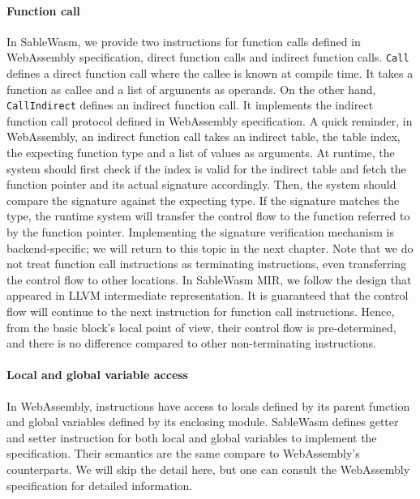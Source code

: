 \paragraph{Function call} In SableWasm, we provide two instructions for function calls defined in WebAssembly specification, direct function calls and indirect function calls. \texttt{Call} defines a direct function call where the callee is known at compile time. It takes a function as callee and a list of arguments as operands. On the other hand, \texttt{CallIndirect} defines an indirect function call. It implements the indirect function call protocol defined in WebAssembly specification. A quick reminder, in WebAssembly, an indirect function call takes an indirect table, the table index, the expecting function type and a list of values as arguments. At runtime, the system should first check if the index is valid for the indirect table and fetch the function pointer and its actual signature accordingly. Then, the system should compare the signature against the expecting type. If the signature matches the type, the runtime system will transfer the control flow to the function referred to by the function pointer. Implementing the signature verification mechanism is backend-specific; we will return to this topic in the next chapter. Note that we do not treat function call instructions as terminating instructions, even transferring the control flow to other locations. In SableWasm MIR, we follow the design that appeared in LLVM intermediate representation. It is guaranteed that the control flow will continue to the next instruction for function call instructions. Hence, from the basic block's local point of view, their control flow is pre-determined, and there is no difference compared to other non-terminating instructions.

\paragraph{Local and global variable access} In WebAssembly, instructions have access to locals defined by its parent function and global variables defined by its enclosing module. SableWasm defines getter and setter instruction for both local and global variables to implement the specification. Their semantics are the same compare to WebAssembly's counterparts. We will skip the detail here, but one can consult the WebAssembly specification for detailed information.

